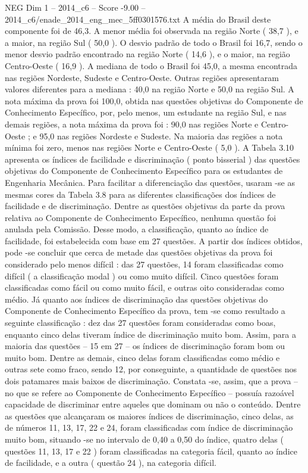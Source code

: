 \begin{textsample}{NEG Dim 1 – 2014\_c6 – Score -9.00 – 2014\_c6/enade\_2014\_eng\_mec\_5ff0301576.txt}
A média do Brasil deste componente foi de 46,3.
A menor média foi observada na região Norte ( 38,7 ), e a maior, na região Sul ( 50,0 ).
O desvio padrão de todo o Brasil foi 16,7, sendo o menor desvio padrão encontrado na região Norte ( 14,6 ), e o maior, na região Centro-Oeste ( 16,9 ).
A mediana de todo o Brasil foi 45,0, a mesma encontrada nas regiões Nordeste, Sudeste e Centro-Oeste.
Outras regiões apresentaram valores diferentes para a mediana : 40,0 na região Norte e 50,0 na região Sul.
A nota máxima da prova foi 100,0, obtida nas questões objetivas do Componente de Conhecimento Específico, por, pelo menos, um estudante na região Sul, e nas demais regiões, a nota máxima da prova foi : 90,0 nas regiões Norte e Centro-Oeste ; e 95,0 nas regiões Nordeste e Sudeste.
Na maioria das regiões a nota mínima foi zero, menos nas regiões Norte e Centro-Oeste ( 5,0 ).
A Tabela 3.10 apresenta os índices de facilidade e discriminação ( ponto bisserial ) das questões objetivas do Componente de Conhecimento Específico para os estudantes de Engenharia Mecânica.
Para facilitar a diferenciação das questões, usaram -se as mesmas cores da Tabela 3.8 para as diferentes classificações dos índices de facilidade e de discriminação.
Dentre as questões objetivas da parte da prova relativa ao Componente de Conhecimento Específico, nenhuma questão foi anulada pela Comissão.
Desse modo, a classificação, quanto ao índice de facilidade, foi estabelecida com base em 27 questões.
A partir dos índices obtidos, pode -se concluir que cerca de metade das questões objetivas da prova foi considerado pelo menos difícil : das 27 questões, 14 foram classificadas como difícil ( a classificação modal ) ou como muito difícil.
Cinco questões foram classificadas como fácil ou como muito fácil, e outras oito consideradas como médio.
Já quanto aos índices de discriminação das questões objetivas do Componente de Conhecimento Específico da prova, tem -se como resultado a seguinte classificação : dez das 27 questões foram consideradas como boas, enquanto cinco delas tiveram índice de discriminação muito bom.
Assim, para a maioria das questões – 15 em 27 – os índices de discriminação foram bom ou muito bom.
Dentre as demais, cinco delas foram classificadas como médio e outras sete como fraco, sendo 12, por conseguinte, a quantidade de questões nos dois patamares mais baixos de discriminação.
Constata -se, assim, que a prova – no que se refere ao Componente de Conhecimento Específico – possuía razoável capacidade de discriminar entre aqueles que dominam ou não o conteúdo.
Dentre as questões que alcançaram os maiores índices de discriminação, cinco delas, as de números 11, 13, 17, 22 e 24, foram classificadas com índice de discriminação muito bom, situando -se no intervalo de 0,40 a 0,50 do índice, quatro delas ( questões 11, 13, 17 e 22 ) foram classificadas na categoria fácil, quanto ao índice de facilidade, e a outra ( questão 24 ), na categoria difícil.

\end{textsample}
